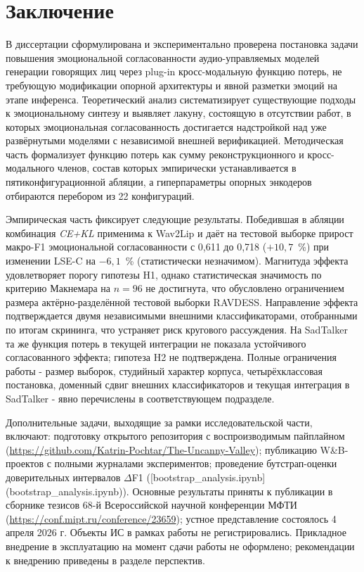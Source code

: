 \documentclass[a4paper, 12pt, oneside, openany]{article}
\begin{document}
\section{Заключение}

В диссертации сформулирована и экспериментально проверена постановка задачи повышения эмоциональной согласованности аудио-управляемых моделей генерации говорящих лиц через plug-in кросс-модальную функцию потерь, не требующую модификации опорной архитектуры и явной разметки эмоций на этапе инференса. Теоретический анализ систематизирует существующие подходы к эмоциональному синтезу и выявляет лакуну, состоящую в отсутствии работ, в которых эмоциональная согласованность достигается надстройкой над уже развёрнутыми моделями с независимой внешней верификацией. Методическая часть формализует функцию потерь как сумму реконструкционного и кросс-модального членов, состав которых эмпирически устанавливается в пятиконфигурационной абляции, а гиперпараметры опорных энкодеров отбираются перебором из 22 конфигураций.

Эмпирическая часть фиксирует следующие результаты. Победившая в абляции комбинация \textit{CE+KL} применима к Wav2Lip и даёт на тестовой выборке прирост макро-F1 эмоциональной согласованности с 0,611 до 0,718 ($+10{,}7$~\%) при изменении LSE-C на $-6{,}1$~\% (статистически незначимом). Магнитуда эффекта удовлетворяет порогу гипотезы H1, однако статистическая значимость по критерию Макнемара на $n=96$ не достигнута, что обусловлено ограничением размера актёрно-разделённой тестовой выборки RAVDESS. Направление эффекта подтверждается двумя независимыми внешними классификаторами, отобранными по итогам скрининга, что устраняет риск кругового рассуждения. На SadTalker та же функция потерь в текущей интеграции не показала устойчивого согласованного эффекта; гипотеза H2 не подтверждена. Полные ограничения работы - размер выборок, студийный характер корпуса, четырёхклассовая постановка, доменный сдвиг внешних классификаторов и текущая интеграция в SadTalker - явно перечислены в соответствующем подразделе.

Дополнительные задачи, выходящие за рамки исследовательской части, включают: подготовку открытого репозитория с воспроизводимым пайплайном (\url{https://github.com/Katrin-Pochtar/The-Uncanny-Valley}); публикацию W\&B-проектов с полными журналами экспериментов; проведение бутстрап-оценки доверительных интервалов $\Delta$F1 ([bootstrap\_analysis.ipynb](bootstrap\_analysis.ipynb)). Основные результаты приняты к публикации в сборнике тезисов 68-й Всероссийской научной конференции МФТИ (\url{https://conf.mipt.ru/conference/23659}); устное представление состоялось 4 апреля 2026 г. Объекты ИС в рамках работы не регистрировались. Прикладное внедрение в эксплуатацию на момент сдачи работы не оформлено; рекомендации к внедрению приведены в разделе перспектив.
\end{document}
